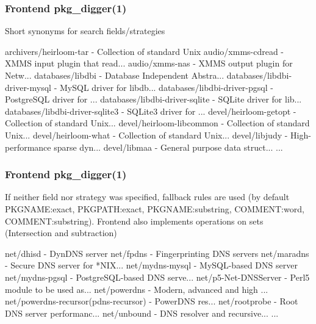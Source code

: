\documentclass[hyperref=unicode,ascii,xcolor=dvipsnames]{beamer}
\begin{document}

\begin{frame}[fragile]
  \frametitle{Frontend pkg\_digger(1)}
  \begin{block}{Short synonyms for search fields/strategies}
    \begin{Code}{}
archivers/heirloom-tar -   Collection of standard Unix
audio/xmms-cdread      -   XMMS input plugin that read...
audio/xmms-nas         -   XMMS output plugin for Netw...
databases/libdbi       -   Database Independent Abstra...
databases/libdbi-driver-mysql - MySQL driver for libdb...
databases/libdbi-driver-pgsql - PostgreSQL driver for ...
databases/libdbi-driver-sqlite - SQLite driver for lib...
databases/libdbi-driver-sqlite3 -  SQLite3 driver for ...
devel/heirloom-getopt  -   Collection of standard Unix...
devel/heirloom-libcommon - Collection of standard Unix...
devel/heirloom-what    -   Collection of standard Unix...
devel/libjudy          -   High-performance sparse dyn...
devel/libmaa           -   General purpose data struct...
...
\prompt{#}
    \end{Code}
  \end{block}
\end{frame}


\begin{frame}[fragile]
  \frametitle{Frontend pkg\_digger(1)}
{\small If neither field nor strategy was specified, fallback rules are used
(by default PKGNAME:exact, PKGPATH:exact,
PKGNAME:substring, COMMENT:word, COMMENT:substring). Frontend also
implements operations on sets (Intersection and subtraction)}
\vspace{-0.3cm}
\begin{block}{}
    \begin{Code}{}
net/dhisd              -   DynDNS server
net/fpdns              -   Fingerprinting DNS servers
net/maradns            -   Secure DNS server for *NIX...
net/mydns-mysql        -   MySQL-based DNS server
net/mydns-pgsql        -   PostgreSQL-based DNS serve...
net/p5-Net-DNSServer   -   Perl5 module to be used as...
net/powerdns           -   Modern, advanced and high ...
net/powerdns-recursor(pdns-recursor) -   PowerDNS res...
net/rootprobe          -   Root DNS server performanc...
net/unbound            -   DNS resolver and recursive...
...
\prompt{#}
    \end{Code}
  \end{block}
\end{frame}
\end{document}

